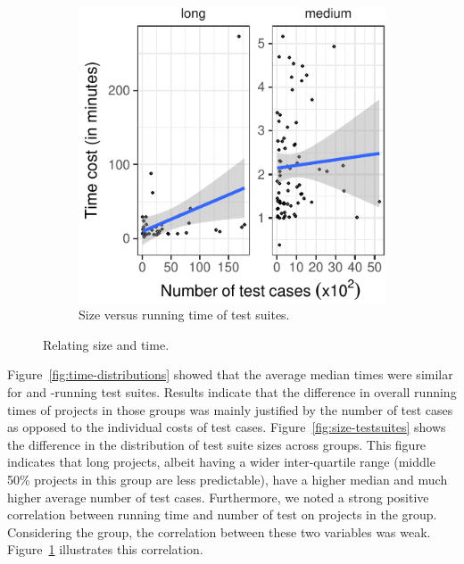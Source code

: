 \begin{figure}[t]
\begin{subfigure}{0.3\textwidth}
    \includegraphics[width=.95\textwidth]{results/scatter-testcost.pdf}
    \caption{\label{fig:scattercost}Size versus running time of
      test suites.}
  \end{subfigure}
  \caption{\label{fig:time-versus-size}Relating size and time.}%
\end{figure}


Figure~\ref{fig:time-distributions} showed that the average median
times were similar for \medg{} and \longg{}-running test suites.
Results indicate that the difference in overall running times of
projects in those groups was mainly justified by the number of test
cases as opposed to the individual costs of test cases.
Figure~\ref{fig:size-testsuites} shows the difference in the
distribution of test suite sizes across groups.  This figure indicates
that long projects, albeit having a wider inter-quartile range (middle
50\% projects in this group are less predictable), have a higher
median and much higher average number of test cases.  Furthermore, we
noted a strong positive correlation between running time and number of
test on projects in the \longg{} group.  Considering the \medg{}
group, the correlation between these two variables was weak.
Figure~\ref{fig:scattercost} illustrates this correlation.


